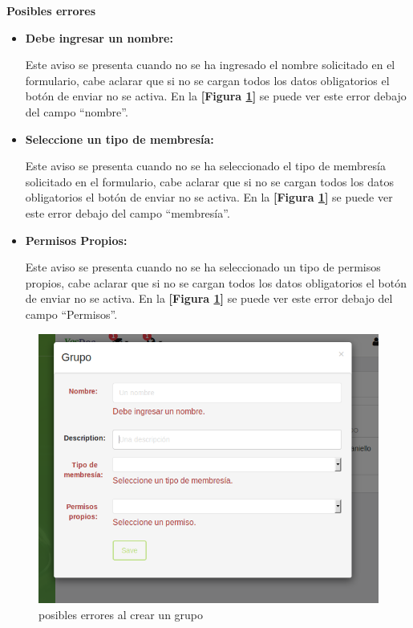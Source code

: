 \textbf{Posibles errores}


\begin{itemize}
	\item \textbf{Debe ingresar un nombre:} 
	
	Este aviso se presenta cuando no se ha ingresado el nombre solicitado en el formulario, cabe aclarar que si no se cargan todos los datos obligatorios el botón de enviar no se activa. En la \textbf{[Figura \ref{mu-crear_grupo_errores}]} se puede ver este error debajo del campo ``nombre''.
	
	\item \textbf{Seleccione un tipo de membresía: } 
	
	Este aviso se presenta cuando no se ha seleccionado el tipo de membresía solicitado en el formulario, cabe aclarar que si no se cargan todos los datos obligatorios el botón de enviar no se activa.  En la \textbf{[Figura \ref{mu-crear_grupo_errores}]} se puede ver este error debajo del campo ``membresía''.
	
	\item \textbf{Permisos Propios:} 
	
	Este aviso se presenta cuando no se ha seleccionado un tipo de  permisos propios, cabe aclarar que si no se cargan todos los datos obligatorios el botón de enviar no se activa.  En la \textbf{[Figura \ref{mu-crear_grupo_errores}]} se puede ver este error debajo del campo ``Permisos''.
	
\end{itemize}

    \begin{figure}
    	\centering
    	\includegraphics[width=.8\textwidth]{img/manual_de_usuario/crear_grupo_errores}
    	\caption{posibles errores al crear un grupo}
    	\label{mu-crear_grupo_errores}
    \end{figure}


